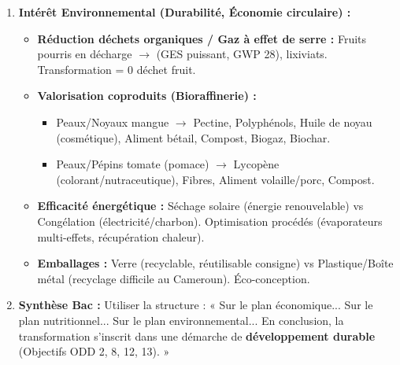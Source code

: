 \documentclass[11pt]{article}
\begin{document}
\begin{methode}
\begin{enumerate}
\begin{itemize}
            \end{itemize}
        \item \textbf{Intérêt Environnemental (Durabilité, Économie circulaire) :}
            \begin{itemize}
                \item \textbf{Réduction déchets organiques / Gaz à effet de serre :} Fruits pourris en décharge $\rightarrow$  (GES puissant, GWP 28), lixiviats. Transformation = 0 déchet fruit.
                \item \textbf{Valorisation coproduits (Bioraffinerie) :}
                    \begin{itemize}
                        \item Peaux/Noyaux mangue $\rightarrow$ Pectine, Polyphénols, Huile de noyau (cosmétique), Aliment bétail, Compost, Biogaz, Biochar.
                        \item Peaux/Pépins tomate (pomace) $\rightarrow$ Lycopène (colorant/nutraceutique), Fibres, Aliment volaille/porc, Compost.
                    \end{itemize}
                \item \textbf{Efficacité énergétique :} Séchage solaire (énergie renouvelable) vs Congélation (électricité/charbon). Optimisation procédés (évaporateurs multi-effets, récupération chaleur).
                \item \textbf{Emballages :} Verre (recyclable, réutilisable consigne) vs Plastique/Boîte métal (recyclage difficile au Cameroun). Éco-conception.
            \end{itemize}
        \item \textbf{Synthèse Bac :} Utiliser la structure : « Sur le plan économique... Sur le plan nutritionnel... Sur le plan environnemental... En conclusion, la transformation s'inscrit dans une démarche de \textbf{développement durable} (Objectifs ODD 2, 8, 12, 13). »
    \end{enumerate}
\end{methode}
\end{document}

